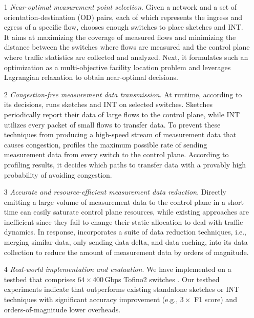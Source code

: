 \begin{itemize}[leftmargin=*]
%
    \item[1] \emph{Near-optimal measurement point selection}. Given a network and a set of orientation-destination (OD) pairs, each of which represents the ingress and egress of a specific flow, \sysname chooses enough switches to place sketches and INT. It aims at maximizing the coverage of measured flows and minimizing the distance between the switches where flows are measured and the control plane where traffic statistics are collected and analyzed. Next, it formulates such an optimization as a multi-objective facility location problem and leverages Lagrangian relaxation to obtain near-optimal decisions. 
%
    \item[2] \emph{Congestion-free measurement data transmission}. At runtime, according to its decisions, \sysname runs sketches and INT on selected switches. Sketches periodically report their data of large flows to the control plane, while INT utilizes every packet of small flows to transfer data. To prevent these techniques from producing a high-speed stream of measurement data that causes congestion, \sysname profiles the maximum possible rate of sending measurement data from every switch to the control plane. According to profiling results, it decides which paths to transfer data with a provably high probability of avoiding congestion. 
%
    \item[3] \emph{Accurate and resource-efficient measurement data reduction}. Directly emitting a large volume of measurement data to the control plane in a short time can easily saturate control plane resources, while existing approaches \cite{chen2021mtp} are inefficient since they fail to change their static allocation to deal with traffic dynamics. In response, \sysname incorporates a suite of data reduction techniques, i.e., merging similar data, only sending data delta, and data caching, into its data collection to reduce the amount of measurement data by orders of magnitude. 
%
    \item[4] \emph{Real-world implementation and evaluation}. We have implemented \sysname on a testbed that comprises $64\times 400$\,Gbps Tofino2 switches \cite{tofino2}. Our testbed experiments indicate that \sysname outperforms existing standalone sketches or INT techniques with significant accuracy improvement (e.g., $3\times$ F1 score) and orders-of-magnitude lower overheads. 
%
\end{itemize}

